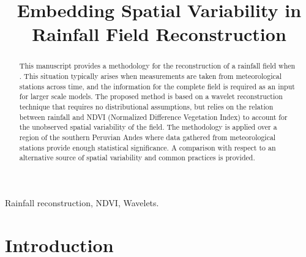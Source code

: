 



\title{Embedding Spatial Variability in Rainfall Field Reconstruction} 

	
\author{
}

\maketitle

\begin{abstract}
	
This manuscript provides a methodology for the reconstruction of a rainfall  field when .  This situation typically arises when measurements are taken from  meteorological stations across time, and the information for the complete field is required as an input for larger scale models. The proposed method is based on a wavelet reconstruction technique that requires no distributional assumptions, but relies on the relation between rainfall and 
NDVI (Normalized Difference Vegetation Index) to account for the unobserved spatial variability of the field. The methodology is applied over a region of the southern Peruvian Andes where data gathered from meteorological stations provide enough  statistical significance. A comparison  with respect to an alternative source of spatial variability and common practices is provided. 
\end{abstract}

\begin{keywords}
Rainfall reconstruction, NDVI, Wavelets. 
\end{keywords}


\section{Introduction}


